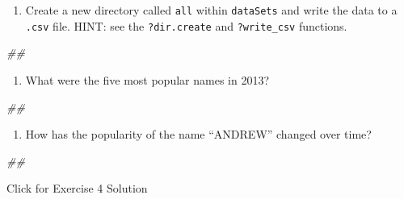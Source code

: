 \documentclass[
]{book}
\newenvironment{Shaded}{\begin{snugshade}}{\end{snugshade}}
\newcommand{\CommentTok}[1]{\textcolor[rgb]{0.56,0.35,0.01}{\textit{#1}}}
\providecommand{\tightlist}{%
  \setlength{\itemsep}{0pt}\setlength{\parskip}{0pt}}
\begin{document}
\begin{enumerate}
\def\labelenumi{\arabic{enumi}.}
\setcounter{enumi}{1}
\tightlist
\item
  Create a new directory called \texttt{all} within \texttt{dataSets} and write the data to a \texttt{.csv} file. HINT: see the \texttt{?dir.create} and \texttt{?write\_csv} functions.
\end{enumerate}

\begin{Shaded}
\begin{Highlighting}[]
\CommentTok{\#\# }
\end{Highlighting}
\end{Shaded}

\begin{enumerate}
\def\labelenumi{\arabic{enumi}.}
\setcounter{enumi}{2}
\tightlist
\item
  What were the five most popular names in 2013?
\end{enumerate}

\begin{Shaded}
\begin{Highlighting}[]
\CommentTok{\#\# }
\end{Highlighting}
\end{Shaded}

\begin{enumerate}
\def\labelenumi{\arabic{enumi}.}
\setcounter{enumi}{3}
\tightlist
\item
  How has the popularity of the name ``ANDREW'' changed over time?
\end{enumerate}

\begin{Shaded}
\begin{Highlighting}[]
\CommentTok{\#\# }
\end{Highlighting}
\end{Shaded}

{Click for Exercise 4 Solution}
\end{document}
